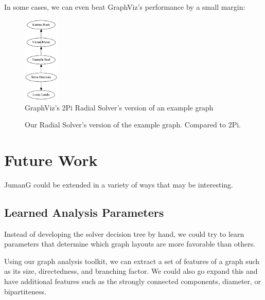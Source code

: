 \documentclass{article}
\begin{document}
In some cases, we can even beat GraphViz's performance by a small margin:

\begin{figure}[h!]
\caption{GraphViz's 2Pi Radial Solver's version of an example graph}
\centering
\includegraphics[width=0.15\textwidth]{turnip_dag.png}
\end{figure}

\begin{figure}
\caption{Our Radial Solver's version of the example graph. Compared to 2Pi.}
\end{figure}




\section{Future Work}
JumanG could be extended in a variety of ways that may be interesting. 

\subsection{Learned Analysis Parameters}
Instead of developing the solver decision tree by hand, we could try to learn parameters that determine which graph layouts are more favorable than others. 

Using our graph analysis toolkit, we can extract a set of features of a graph such as its size, directedness, and branching factor. We could also go expand this and have additional features such as the strongly connected components, diameter, or bipartiteness.
\end{document}
